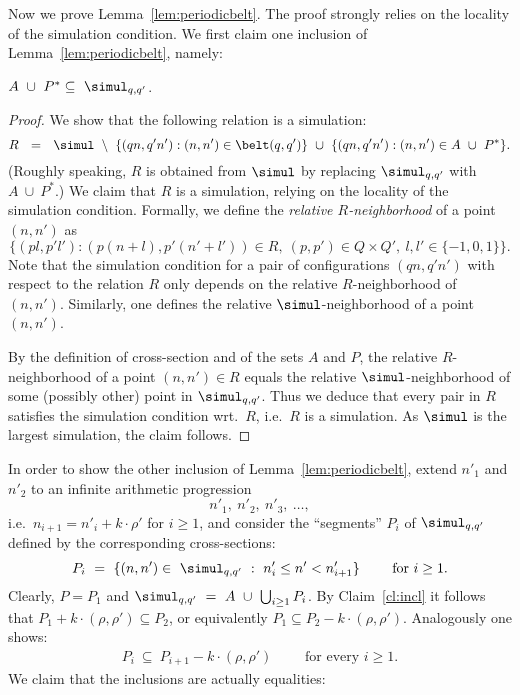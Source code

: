 Now we prove Lemma~\ref{lem:periodicbelt}. The proof strongly relies on the locality of the simulation condition.
We first claim one inclusion of Lemma~\ref{lem:periodicbelt}, namely:
\begin{claim} \label{cl:incl}
$A \ \cup \ P^* \subseteq \ \simul_{q,q'}$.
\end{claim}
\begin{proof}
We show  that the following relation is a simulation:
\[
R \ \ = \ \ \simul \ \setminus \ \{ (q n, q' n') : (n,n') \in \belt(q,q')\}
\ \cup \ \{ (q n , q' n') : (n,n') \in A \ \cup \ P^* \}.
\]
(Roughly speaking, $R$ is obtained from $\simul$ by replacing $\simul_{q,q'}$ with $A \ \cup \ P^*$.)
We claim that $R$ is a simulation, relying on the locality of the simulation condition.
Formally, we define the \emph{relative $R$-neighborhood} of a point $(n,n')$ as 
\[
\{ (p l, p' l') : (p (n+l), p' (n'+l')) \in R, \ (p, p') \in Q\times Q', \ l, l' \in \{-1,0,1\} \} .
\] 
Note that the simulation condition for a pair of configurations $(q n, q' n')$ with respect to the relation $R$ 
only depends on the relative $R$-neighborhood of $(n, n')$. 
Similarly, one defines the relative $\simul$-neighborhood of a point $(n, n')$.

By the definition of cross-section and of the sets $A$ and $P$, 
the relative $R$-neighborhood of a point $(n,n') \in R$ equals the relative $\simul$-neighborhood of some 
(possibly other) point in $\simul_{q,q'}$.
Thus we deduce that every pair in $R$ satisfies the simulation condition wrt.~$R$, i.e.~$R$ is a simulation.
As $\simul$ is the largest simulation, the claim follows.
\end{proof}

In order to show the other inclusion of Lemma~\ref{lem:periodicbelt}, extend $n'_1$ and $n'_2$ to an infinite arithmetic progression
\[
n'_1, \ n'_2, \ n'_3, \ \ldots,
\]
i.e.~$n_{i+1} = n'_i + k \cdot \rho'$ for $i \geq 1$,
and consider the ``segments'' $P_i$ of $\simul_{q,q'}$ defined by the corresponding cross-sections:
\[
P_i \ = \  \{ (n,n')  \in \ \simul_{q,q'} \ : \ n'_i \leq n' < n'_{i+1} \} \qquad \text{ for } i \geq 1. 
\]
Clearly, $P = P_1$ and 
$\simul_{q,q'} \ = \ A \ \cup \ \bigcup_{i \geq 1} P_i$.
By Claim~\ref{cl:incl} it follows that $P_1 + k \cdot (\rho,\rho') \subseteq P_2$, or equivalently
$P_1 \subseteq P_2 - k \cdot (\rho,\rho')$. Analogously one shows:
\begin{align}  \label{eq:incl}
P_i  \ \subseteq \ P_{i+1} - k\cdot (\rho,\rho') \qquad \text{ for every } i \geq 1.
\end{align}
We claim that the inclusions are actually equalities:

